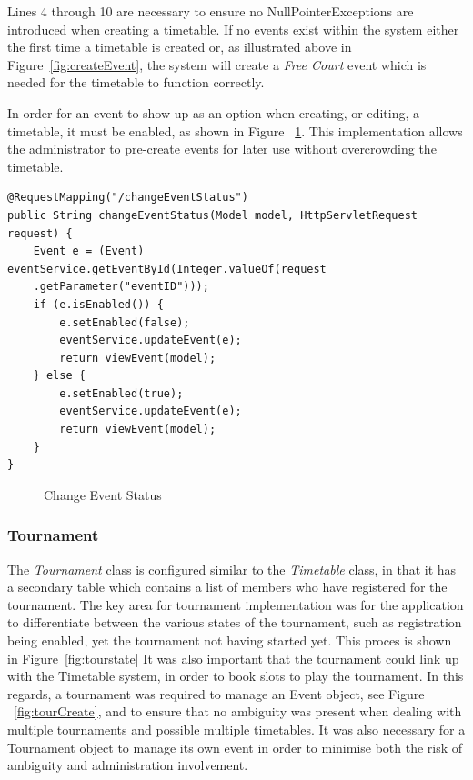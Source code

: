 Lines 4 through 10 are necessary to ensure no NullPointerExceptions are introduced when creating a timetable. If no events exist within the system either the first time a timetable is created or, as illustrated above in Figure~\ref{fig:createEvent}, the system will create a \textit{Free Court} event which is needed for the timetable to function correctly.

In order for an event to show up as an option when creating, or editing, a timetable, it must be enabled, as shown in Figure ~\ref{fig:enableEvent}. This implementation allows the administrator to pre-create events for later use without overcrowding the timetable.

\begin{lstlisting}
@RequestMapping("/changeEventStatus")
public String changeEventStatus(Model model, HttpServletRequest request) {
	Event e = (Event) eventService.getEventById(Integer.valueOf(request
	.getParameter("eventID")));
	if (e.isEnabled()) {
		e.setEnabled(false);
		eventService.updateEvent(e);
		return viewEvent(model);
	} else {
		e.setEnabled(true);
		eventService.updateEvent(e);
		return viewEvent(model);
	}
}
\end{lstlisting}
\begin{figure}[H]
\caption{Change Event Status}
\label{fig:enableEvent}
\end{figure} 	

\subsubsection{Tournament}

The \textit{Tournament} class is configured similar to the \textit{Timetable} class, in that it has a secondary table which contains a list of members who have registered for the tournament. The key area for tournament implementation was for the application to differentiate between the various states of the tournament, such as registration being enabled, yet the tournament not having started yet. This proces is shown in Figure~\ref{fig:tourstate} It was also important that the tournament could link up with the Timetable system, in order to book slots to play the tournament. In this regards, a tournament was required to manage an Event object, see Figure ~\ref{fig:tourCreate}, and to ensure that no ambiguity was present when dealing with multiple tournaments and possible multiple timetables. It was also necessary for a Tournament object to manage its own event in order to minimise both the risk of ambiguity and administration involvement.



